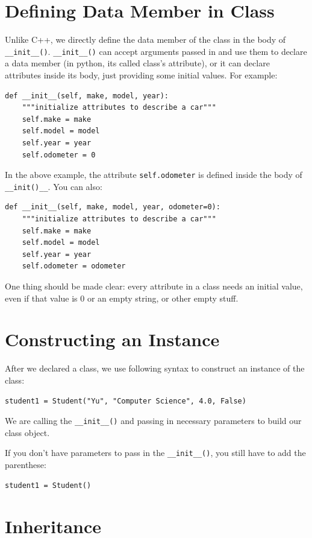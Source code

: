 \documentclass[12pt]{book}
\begin{document}
\section{Defining Data Member in Class}
\label{sec:org6221688}
Unlike C++, we directly define the data member of the class in the body of \texttt{\_\_init\_\_()}. \texttt{\_\_init\_\_()} can accept arguments passed in and use them to declare a data member (in python, its called class's attribute), or it can declare attributes inside its body, just providing some initial values. For example:
\begin{verbatim}
def __init__(self, make, model, year):
    """initialize attributes to describe a car"""
    self.make = make
    self.model = model
    self.year = year
    self.odometer = 0
\end{verbatim}
In the above example, the attribute \texttt{self.odometer} is defined inside the body of \texttt{\_\_init()\_\_}. You can also:
\begin{verbatim}
def __init__(self, make, model, year, odometer=0):
    """initialize attributes to describe a car"""
    self.make = make
    self.model = model
    self.year = year
    self.odometer = odometer
\end{verbatim}

One thing should be made clear: every attribute in a class needs an initial value, even if that value is 0 or an empty string, or other empty stuff.
\section{Constructing an Instance}
\label{sec:org191ac72}
After we declared a class, we use following syntax to construct an instance of the class:
\begin{verbatim}
student1 = Student("Yu", "Computer Science", 4.0, False)
\end{verbatim}
We are calling the \texttt{\_\_init\_\_()} and passing in necessary parameters to build our class object.

If you don't have parameters to pass in the \texttt{\_\_init\_\_()}, you still have to add the parenthese:
\begin{verbatim}
student1 = Student()
\end{verbatim}
\section{Inheritance}
\label{sec:org0d6d0cf}
\end{document}
